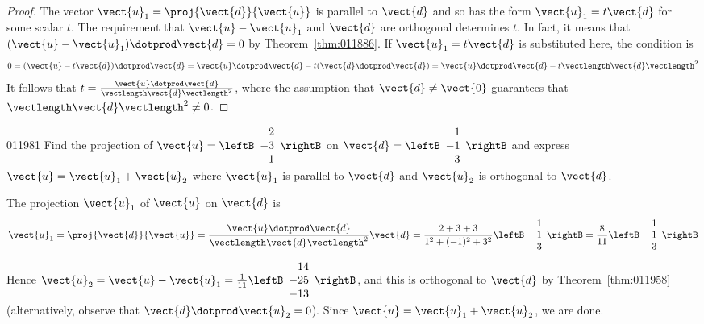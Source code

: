 \begin{proof}
The vector $\vect{u}_{1} = \proj{\vect{d}}{\vect{u}}$ is parallel to $\vect{d}$ and so has the form $\vect{u}_{1} = t\vect{d}$ for some scalar $t$. The requirement that $\vect{u} - \vect{u}_{1}$ and $\vect{d}$ are orthogonal determines $t$. In fact, it means that $(\vect{u} - \vect{u}_{1}) \dotprod \vect{d} = 0$ by Theorem~\ref{thm:011886}. If $\vect{u}_{1} = t\vect{d}$ is substituted here, the condition is
\begin{equation*}
0 = (\vect{u} - t\vect{d}) \dotprod \vect{d} = \vect{u} \dotprod \vect{d} - t(\vect{d} \dotprod \vect{d}) = \vect{u} \dotprod \vect{d} - t\vectlength \vect{d} \vectlength^2
\end{equation*}
It follows that $t = \frac{\vect{u} \dotprod \vect{d}}{\vectlength \vect{d} \vectlength^2}$, where the assumption that $\vect{d} \neq \vect{0}$ guarantees that $\vectlength \vect{d} \vectlength^{2} \neq 0$.
\end{proof}

\begin{example}{}{011981}
Find the projection of 
$\vect{u} = \leftB
\begin{array}{r}
2 \\
-3 \\
1
\end{array}
\rightB$
 on 
$\vect{d} = \leftB
\begin{array}{r}
1\\
-1 \\
3
\end{array}
\rightB$
 and express $\vect{u} = \vect{u}_{1} + \vect{u}_{2}$ where $\vect{u}_{1}$ is parallel to $\vect{d}$ and $\vect{u}_{2}$ is orthogonal to $\vect{d}$.


\begin{solution}
  The projection $\vect{u}_{1}$ of $\vect{u}$ on $\vect{d}$ is
\begin{equation*}
\vect{u}_{1} = \proj{\vect{d}}{\vect{u}} = \frac{\vect{u} \dotprod \vect{d}}{\vectlength \vect{d} \vectlength^2}\vect{d} = \frac{2 + 3 + 3}{1^2 + (-1)^2 + 3^2} 
\leftB
\begin{array}{r}
1\\
-1 \\
3
\end{array}
\rightB
= \frac{8}{11}\leftB
\begin{array}{r}
1\\
-1 \\
3
\end{array}
\rightB
\end{equation*}
Hence $\vect{u}_{2} = \vect{u} - \vect{u}_{1} = 
\frac{1}{11}\leftB
\begin{array}{r}
14\\
-25 \\
-13
\end{array}
\rightB$, and this is orthogonal to $\vect{d}$ by Theorem~\ref{thm:011958} (alternatively, observe that $\vect{d} \dotprod \vect{u}_{2} = 0$). Since $\vect{u} = \vect{u}_{1} + \vect{u}_{2}$, we are done.
\end{solution}
\end{example}

